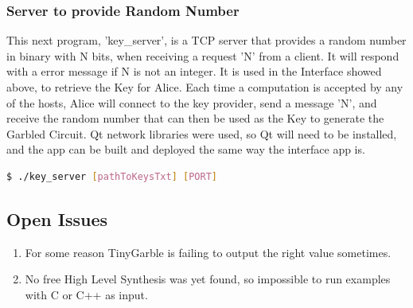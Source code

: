 \begin{refsection}
\newpage

\subsubsection{Server to provide Random Number}

This next program, 'key\_server', is a TCP server that provides a random number in binary with N bits, when receiving a request 'N' from a client. It will respond with a error message if N is not an integer.
It is used in the Interface showed above, to retrieve the Key for Alice. Each time a computation is accepted by any of the hosts, Alice will connect to the key provider, send a message 'N', and receive the random number that can then be used as the Key to generate the Garbled Circuit.
Qt network libraries were used, so Qt will need to be installed, and the app can be built and deployed the same way the interface app is.

\begin{lstlisting}[caption={Deploying QT application}, language=bash, captionpos=b]
$ ./key_server [pathToKeysTxt] [PORT]
\end{lstlisting}

\subsection{Open Issues}

\begin{enumerate}  
\item For some reason TinyGarble is failing to output the right value sometimes.
\item No free High Level Synthesis was yet found, so impossible to run examples with C or C++ as input.
\end{enumerate}

\clearpage
\printbibliography[heading=subbibliography]
\end{refsection}
\cleardoublepage
